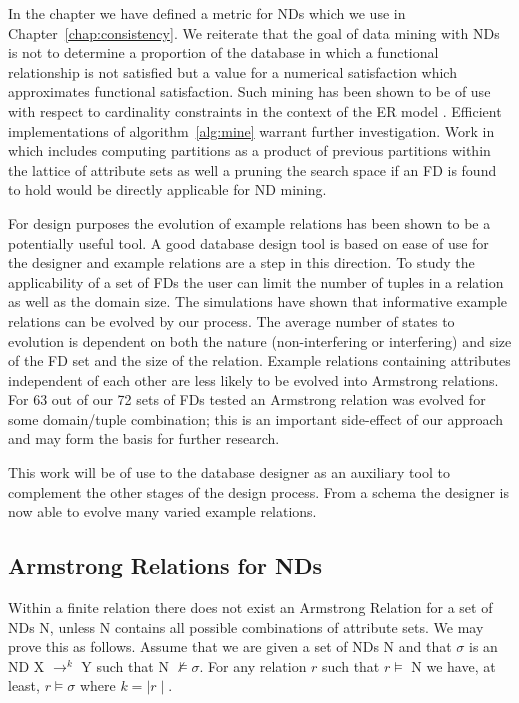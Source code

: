 In the chapter we have defined a metric for NDs which we use in
Chapter~\ref{chap:consistency}. We reiterate that the goal of data
mining with NDs is not to determine a proportion of the database in
which a functional relationship is not satisfied but a value for a
numerical satisfaction which approximates functional
satisfaction. Such mining has been shown to be of use with respect to
cardinality constraints in the context of the ER model
\cite{sou98}. Efficient implementations of algorithm~\ref{alg:mine} 
warrant further investigation. Work in \cite{hkp98} which
includes computing partitions as a product of previous partitions within
the lattice of attribute sets as well a pruning the search space if an
FD is found to hold would be directly applicable for ND mining.

\medskip
{}
For design purposes the evolution of example relations has been shown to
be a potentially useful tool.  A good database
design tool is based on ease of use for the designer and example relations
are a step in this direction. To study the applicability of a set of FDs
 the user can limit the number of tuples in
a relation as well as the domain size. The simulations have shown that 
informative example relations can be evolved by our process.  The 
average number of states to evolution is dependent on both
the nature (non-interfering or interfering) and size of the FD set and the size of the relation.
Example relations containing attributes independent of each other
are less likely to be evolved into Armstrong relations. For 63 out
of our 72 sets of FDs tested an Armstrong relation was evolved
for some domain/tuple combination; this is an important side-effect
of our approach and may form the basis for further research.

\medskip

This work
will be of use to the database designer as an auxiliary tool to complement
the other stages of the design process.  From a schema the designer is now
 able to evolve many varied example relations.\\

\subsection{Armstrong Relations for NDs}\label{subsec:nd_ar}
Within a finite relation there does not exist an
Armstrong Relation for a set of NDs N, unless N contains all possible
combinations of attribute sets. We may prove this as follows. Assume that we
are given a set of NDs N and that $\sigma$ is an ND X $\to^k$ Y such that
N $\not\models \sigma$. For any relation $r$ such that $r \models$ N we
have, at least, $r \models \sigma$ where $k = \mid r \mid$.


